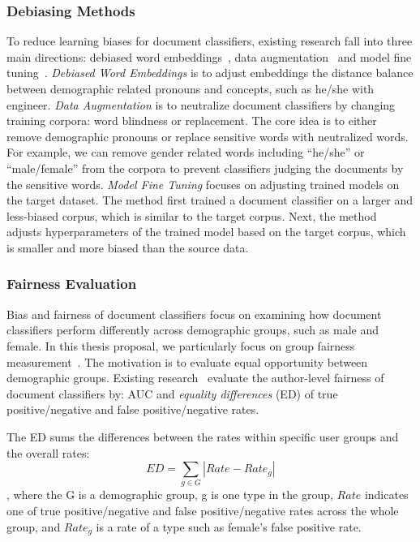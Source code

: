 \subsubsection{Debiasing Methods}

To reduce learning biases for document classifiers, existing research fall into three main directions: debiased word embeddings~\cite{zhao2017men}, data augmentation~\cite{dixon2018measuring, zhao2019gender} and model fine tuning~\cite{park2018reducing}.
\textit{Debiased Word Embeddings} is to adjust embeddings the distance balance between demographic related pronouns and concepts, such as he/she with engineer.
\textit{Data Augmentation} is to neutralize document classifiers by changing training corpora: word blindness or replacement. 
The core idea is to either remove demographic pronouns or replace sensitive words with neutralized words.
For example, we can remove gender related words including  ``he/she'' or ``male/female'' from the corpora to prevent classifiers judging the documents by the sensitive words.
\textit{Model Fine Tuning} focuses on adjusting trained models on the target dataset. The method first trained a document classifier on a larger and less-biased corpus, which is similar to the target corpus. 
Next, the method adjusts hyperparameters of the trained model based on the target corpus, which is smaller and more biased than the source data.


\subsubsection{Fairness Evaluation}

Bias and fairness of document classifiers focus on examining how document classifiers perform differently across demographic groups, such as male and female.
In this thesis proposal, we particularly focus on group fairness measurement~\cite{hardt2016equality}. 
The motivation is to evaluate equal opportunity between demographic groups.
Existing research~\cite{dixon2018measuring, garg2019counterfactual, park2018reducing} evaluate the author-level fairness of document classifiers by: AUC and \textit{equality differences} (ED) of true positive/negative and false positive/negative rates.

The ED sums the differences between the rates within specific user groups and the overall rates:
$$ED = \sum_{g \in G}|Rate - Rate_g|$$
, where the G is a demographic group, g is one type in the group, $Rate$ indicates one of true positive/negative and false positive/negative rates across the whole group, and $Rate_g$ is a rate of a type such as female's false positive rate.
